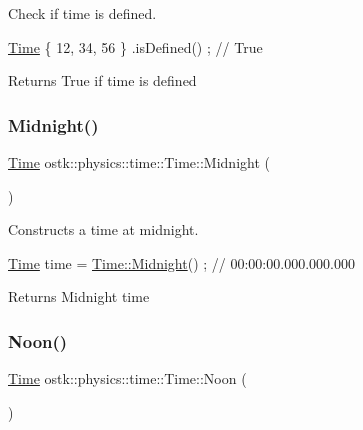 Check if time is defined. 


\begin{DoxyCode}
\hyperlink{classostk_1_1physics_1_1time_1_1_time_a9609e75d328ed240f6fc4529e26038cc}{Time} \{ 12, 34, 56 \} .isDefined() ; \textcolor{comment}{// True}
\end{DoxyCode}


\begin{DoxyReturn}{Returns}
True if time is defined 
\end{DoxyReturn}
\mbox{\label{classostk_1_1physics_1_1time_1_1_time_a74042a99c99ef0f866204a4589c6a89e}} 
\subsubsection{\texorpdfstring{Midnight()}{Midnight()}}
{\footnotesize\ttfamily \hyperlink{classostk_1_1physics_1_1time_1_1_time}{Time} ostk\+::physics\+::time\+::\+Time\+::\+Midnight (\begin{DoxyParamCaption}{ }\end{DoxyParamCaption})\hspace{0.3cm}{\ttfamily [static]}}



Constructs a time at midnight. 


\begin{DoxyCode}
\hyperlink{classostk_1_1physics_1_1time_1_1_time_a9609e75d328ed240f6fc4529e26038cc}{Time} time = \hyperlink{classostk_1_1physics_1_1time_1_1_time_a74042a99c99ef0f866204a4589c6a89e}{Time::Midnight}() ; \textcolor{comment}{// 00:00:00.000.000.000}
\end{DoxyCode}


\begin{DoxyReturn}{Returns}
Midnight time 
\end{DoxyReturn}
\mbox{\label{classostk_1_1physics_1_1time_1_1_time_a2d242e4f07bbf56e51eb2267773042f2}} 
\subsubsection{\texorpdfstring{Noon()}{Noon()}}
{\footnotesize\ttfamily \hyperlink{classostk_1_1physics_1_1time_1_1_time}{Time} ostk\+::physics\+::time\+::\+Time\+::\+Noon (\begin{DoxyParamCaption}{ }\end{DoxyParamCaption})\hspace{0.3cm}{\ttfamily [static]}}



